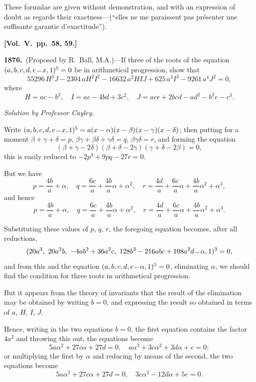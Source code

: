 \documentclass[11pt,a4paper]{article}
\theoremstyle{plain}
\theoremstyle{definition}
\theoremstyle{remark}
\begin{document}
These formulae are given without demonstration, and with an expression of doubt as regards their exactness---(``elles ne me paraissent pas pr\'esenter une suffisante garantie d'exactitude'').

\textbf{[Vol.\ V.\ pp.\ 58, 59.]}

\textbf{1876.}\ (Proposed by R.\ Ball, M.A.)---If three of the roots of the equation $(a,b,c,d,e\,\overline{\vrule width 6pt}\,x,1)^{5}=0$ be in arithmetical progression, show that
\[
55296\,H^{3}J - 2304\,aH^{2}I^{2} - 16632\,a^{2}HIJ + 625\,a^{3}I^{3} - 9261\,a^{4}J^{2} = 0,
\]
where
\[
H=ac-b^{2},\quad I=ae-4bd+3c^{2},\quad J=ace+2bcd-ad^{2}-b^{2}e-c^{3}.
\]

\textit{Solution by Professor Cayley.}

Write $(a,b,c,d,e\,\overline{\vrule width 6pt}\,x,1)^{5}=a(x-\alpha)(x-\beta)(x-\gamma)(x-\delta)$; then putting for a moment $\beta+\gamma+\delta=p$, $\beta\gamma+\beta\delta+\gamma\delta=q$, $\beta\gamma\delta=r$, and forming the equation
\[
(\beta+\gamma-2\delta)(\beta+\delta-2\gamma)(\gamma+\delta-2\beta)=0,
\]
this is easily reduced to $-2p^{3}+9pq-27r=0$.

But we have
\[
p=\frac{4b}{a}+\alpha,\quad q=\frac{6c}{a}+\frac{4b}{a}\alpha+\alpha^{2},\quad r=\frac{4d}{a}+\frac{6c}{a}\alpha+\frac{4b}{a}\alpha^{2}+\alpha^{3},
\]
and hence
\[
p=\frac{4b}{a}+\alpha,\quad q=\frac{6c}{a}+\frac{4b}{a}\alpha+\alpha^{2},\quad r=\frac{4d}{a}+\frac{6c}{a}\alpha+\frac{4b}{a}\alpha^{2}+\alpha^{3}.
\]

Substituting these values of $p$, $q$, $r$, the foregoing equation becomes, after all reductions,
\[
(20a^{3},\ 20a^{2}b,\ -4ab^{2}+36a^{2}c,\ 128b^{3}-216abc+108a^{2}d\,\overline{\vrule width 6pt}\,\alpha,1)^{3}=0,
\]
and from this and the equation $(a,b,c,d,e\,\overline{\vrule width 6pt}\,\alpha,1)^{5}=0$, eliminating $\alpha$, we should find the condition for three roots in arithmetical progression.

But it appears from the theory of invariants that the result of the elimination may be obtained by writing $b=0$, and expressing the result so obtained in terms of $a$, $H$, $I$, $J$.

Hence, writing in the two equations $b=0$, the first equation contains the factor $4a^{2}$ and throwing this out, the equations become
\[
5a\alpha^{2}+27c\alpha+27d=0,\quad a\alpha^{3}+3c\alpha^{2}+3d\alpha+e=0;
\]
or multiplying the first by $\alpha$ and reducing by means of the second, the two equations become
\[
5a\alpha^{2}+27c\alpha+27d=0,\quad 3c\alpha^{2}-12d\alpha+5e=0.
\]
\end{document}
